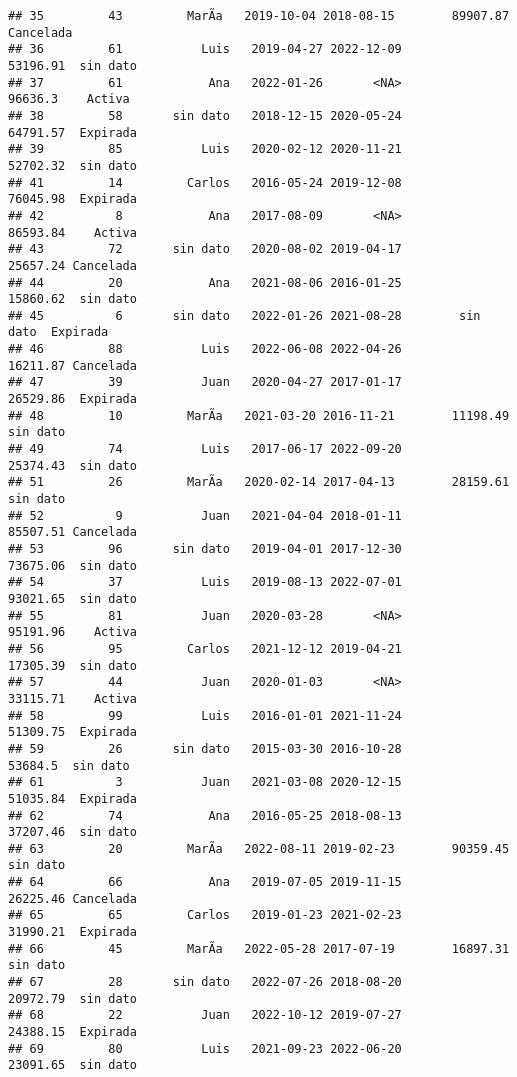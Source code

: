 \documentclass[
]{article}
\begin{document}
\begin{verbatim}
## 35         43         MarÃ­a   2019-10-04 2018-08-15        89907.87 Cancelada
## 36         61           Luis   2019-04-27 2022-12-09        53196.91  sin dato
## 37         61            Ana   2022-01-26       <NA>         96636.3    Activa
## 38         58       sin dato   2018-12-15 2020-05-24        64791.57  Expirada
## 39         85           Luis   2020-02-12 2020-11-21        52702.32  sin dato
## 41         14         Carlos   2016-05-24 2019-12-08        76045.98  Expirada
## 42          8            Ana   2017-08-09       <NA>        86593.84    Activa
## 43         72       sin dato   2020-08-02 2019-04-17        25657.24 Cancelada
## 44         20            Ana   2021-08-06 2016-01-25        15860.62  sin dato
## 45          6       sin dato   2022-01-26 2021-08-28        sin dato  Expirada
## 46         88           Luis   2022-06-08 2022-04-26        16211.87 Cancelada
## 47         39           Juan   2020-04-27 2017-01-17        26529.86  Expirada
## 48         10         MarÃ­a   2021-03-20 2016-11-21        11198.49  sin dato
## 49         74           Luis   2017-06-17 2022-09-20        25374.43  sin dato
## 51         26         MarÃ­a   2020-02-14 2017-04-13        28159.61  sin dato
## 52          9           Juan   2021-04-04 2018-01-11        85507.51 Cancelada
## 53         96       sin dato   2019-04-01 2017-12-30        73675.06  sin dato
## 54         37           Luis   2019-08-13 2022-07-01        93021.65  sin dato
## 55         81           Juan   2020-03-28       <NA>        95191.96    Activa
## 56         95         Carlos   2021-12-12 2019-04-21        17305.39  sin dato
## 57         44           Juan   2020-01-03       <NA>        33115.71    Activa
## 58         99           Luis   2016-01-01 2021-11-24        51309.75  Expirada
## 59         26       sin dato   2015-03-30 2016-10-28         53684.5  sin dato
## 61          3           Juan   2021-03-08 2020-12-15        51035.84  Expirada
## 62         74            Ana   2016-05-25 2018-08-13        37207.46  sin dato
## 63         20         MarÃ­a   2022-08-11 2019-02-23        90359.45  sin dato
## 64         66            Ana   2019-07-05 2019-11-15        26225.46 Cancelada
## 65         65         Carlos   2019-01-23 2021-02-23        31990.21  Expirada
## 66         45         MarÃ­a   2022-05-28 2017-07-19        16897.31  sin dato
## 67         28       sin dato   2022-07-26 2018-08-20        20972.79  sin dato
## 68         22           Juan   2022-10-12 2019-07-27        24388.15  Expirada
## 69         80           Luis   2021-09-23 2022-06-20        23091.65  sin dato

\end{verbatim}
\end{document}
